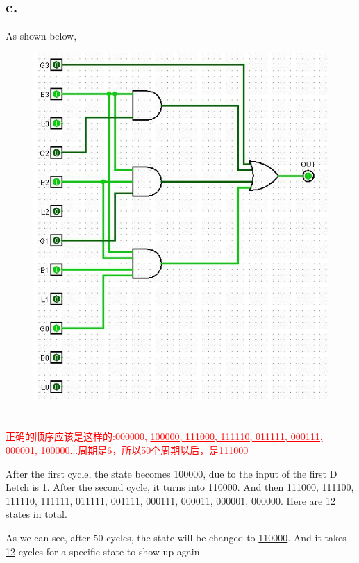 \documentclass[11pt,a4paper]{article}
\begin{document}
	\subsection*{c.}
	As shown below,\par
	\begin{figure}[H]
	\centering
	\includegraphics[width=1\linewidth]{8_c.jpg}
	\label{8_c}
	\end{figure}
	
	
	\section{}
	\textcolor{red}{
		正确的顺序应该是这样的:000000, \underline{100000, 111000, 111110, 011111, 000111, 000001}, 100000...周期是6，所以50个周期以后，是111000
	}\par
	After the first cycle, the state becomes 100000, due to the input of the first D Letch is 1. After the second cycle, it turns into 110000. And then 111000, 111100, 111110, 111111, 011111, 001111, 000111, 000011, 000001, 000000. Here are 12 states in total.\par
	As we can see, after 50 cycles, the state will be changed to \underline{110000}. And it takes \underline{12} cycles for a specific state to show up again.
	
\end{document}
